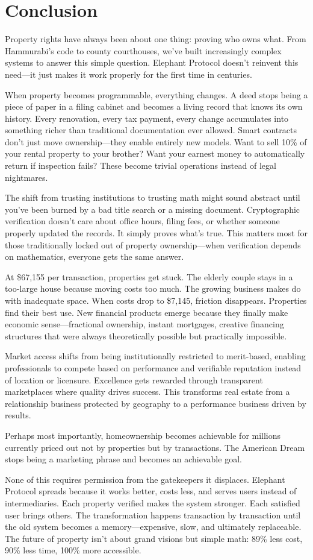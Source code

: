 \chapter{Conclusion}

Property rights have always been about one thing: proving who owns what. From Hammurabi's code to county courthouses, we've built increasingly complex systems to answer this simple question. Elephant Protocol doesn't reinvent this need---it just makes it work properly for the first time in centuries.

When property becomes programmable, everything changes. A deed stops being a piece of paper in a filing cabinet and becomes a living record that knows its own history. Every renovation, every tax payment, every change accumulates into something richer than traditional documentation ever allowed. Smart contracts don't just move ownership---they enable entirely new models. Want to sell 10\% of your rental property to your brother? Want your earnest money to automatically return if inspection fails? These become trivial operations instead of legal nightmares.

The shift from trusting institutions to trusting math might sound abstract until you've been burned by a bad title search or a missing document. Cryptographic verification doesn't care about office hours, filing fees, or whether someone properly updated the records. It simply proves what's true. This matters most for those traditionally locked out of property ownership---when verification depends on mathematics, everyone gets the same answer.

At \$67,155 per transaction, properties get stuck. The elderly couple stays in a too-large house because moving costs too much. The growing business makes do with inadequate space. When costs drop to \$7,145, friction disappears. Properties find their best use. New financial products emerge because they finally make economic sense---fractional ownership, instant mortgages, creative financing structures that were always theoretically possible but practically impossible.

Market access shifts from being institutionally restricted to merit-based, enabling professionals to compete based on performance and verifiable reputation instead of location or licensure. Excellence gets rewarded through transparent marketplaces where quality drives success. This transforms real estate from a relationship business protected by geography to a performance business driven by results.

Perhaps most importantly, homeownership becomes achievable for millions currently priced out not by properties but by transactions. The American Dream stops being a marketing phrase and becomes an achievable goal.

None of this requires permission from the gatekeepers it displaces. Elephant Protocol spreads because it works better, costs less, and serves users instead of intermediaries. Each property verified makes the system stronger. Each satisfied user brings others. The transformation happens transaction by transaction until the old system becomes a memory---expensive, slow, and ultimately replaceable. The future of property isn't about grand visions but simple math: 89\% less cost, 90\% less time, 100\% more accessible.